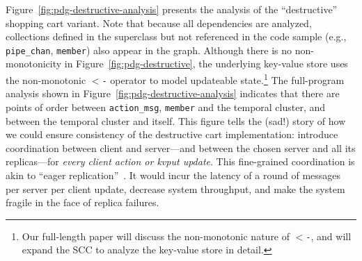 

Figure~\ref{fig:pdg-destructive-analysis} presents the analysis of the 
``destructive'' shopping cart variant.  Note that
because all dependencies are analyzed, collections defined in the superclass
but not referenced in the code sample
(e.g., \texttt{pipe\_chan}, \texttt{member}) also appear in the graph.
Although there is no
non-monotonicity in 
Figure~\ref{fig:pdg-destructive}, the underlying key-value store
uses the non-monotonic \texttt{$<$-} operator to model updateable
state.\footnote{Our full-length paper will discuss the non-monotonic nature of \texttt{$<$-}, and
will expand the SCC to analyze the key-value store in detail.}
The full-program analysis shown in Figure~\ref{fig:pdg-destructive-analysis}
indicates that there are
points of order between \texttt{action\_msg}, \texttt{member} and the temporal cluster,
and between the temporal cluster and itself.
This figure tells the (sad!) story of how we could ensure consistency of the destructive cart implementation: introduce coordination
between client and server---and between the chosen server and all its replicas---for {\em every client action or kvput update}.  This fine-grained coordination is akin to ``eager replication''~\cite{dangers}. It would incur the latency of a round of messages per server per client update, decrease system throughput, and make the system fragile in the face of replica failures.

